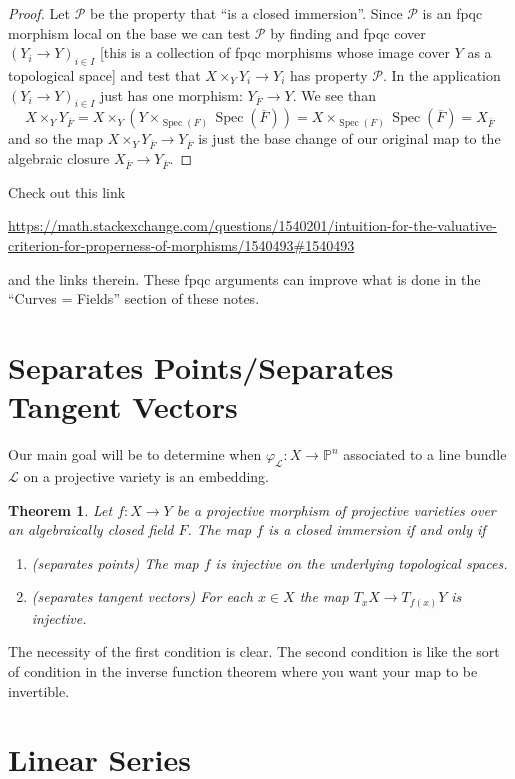 \documentclass[12pt]{article}
\numberwithin{equation}{section}
\newtheorem{theorem}{Theorem}[subsection]
\theoremstyle{definition}
\theoremstyle{remark}
\newcommand{\PP}{\mathbb{P}}
\newcommand{\Spec}{\operatorname{Spec}}
\newcommand{\Lcal}{\mathcal{L}}
\newcommand{\Pcal}{\mathcal{P}}
\newcommand{\Fbar}{\overline{F}}
\begin{document}
\begin{proof}
	Let $\Pcal$ be the property that ``is a closed immersion''.
	Since $\Pcal$ is an fpqc morphism local on the base we can test $\Pcal$ by finding and fpqc cover $(Y_i\to Y)_{i\in I}$ [this is a collection of fpqc morphisms whose image cover $Y$ as a topological space] and test that $X\times_Y Y_i \to Y_i$ has property $\Pcal$.
	In the application $(Y_i\to Y)_{i\in I}$ just has one morphism: $Y_{\Fbar} \to Y$.
	We see than 
	$$X\times_Y Y_{\Fbar} = X \times_Y (Y\times_{\Spec(F) } \Spec(\Fbar) ) = X \times_{\Spec(F)} \Spec(\Fbar) = X_{\Fbar}$$
	and so the map $X\times_Y Y_{\Fbar} \to Y_{\Fbar}$ is just the base change of our original map to the algebraic closure $X_{\Fbar} \to Y_{\Fbar}$.
\end{proof}

Check out this link
\begin{center}
	\url{https://math.stackexchange.com/questions/1540201/intuition-for-the-valuative-criterion-for-properness-of-morphisms/1540493#1540493}
\end{center}
and the links therein. These fpqc arguments can improve what is done in the ``Curves = Fields'' section of these notes.

\section{Separates Points/Separates Tangent Vectors}

Our main goal will be to determine when $\varphi_{\Lcal}:X \to \PP^n$ associated to a line bundle $\Lcal$ on a projective variety is an embedding.
\begin{theorem}\label{thm:points-and-tangents}
	Let $f:X\to Y$ be a projective morphism of projective varieties over an algebraically closed field $F$. 
	The map $f$ is a closed immersion if and only if 
	\begin{enumerate}
		\item (separates points) The map $f$ is injective on the underlying topological spaces.
		\item (separates tangent vectors) For each $x\in X$ the map $T_xX \to T_{f(x)}Y$ is injective.
	\end{enumerate}
\end{theorem}
The necessity of the first condition is clear.
The second condition is like the sort of condition in the inverse function theorem where you want your map to be invertible. 


\section{Linear Series}
\end{document}
